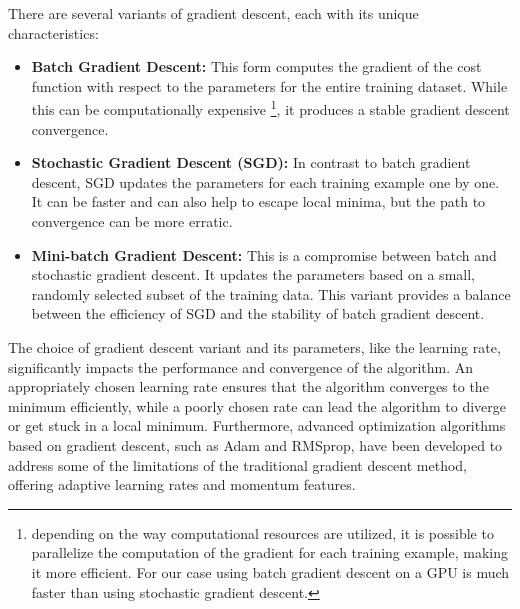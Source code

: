 \documentclass[twoside,11pt]{report}
\begin{document}
    There are several variants of gradient descent, each with its unique characteristics:

    \begin{itemize}
        \item \textbf{Batch Gradient Descent:} This form computes the gradient of the cost function with respect 
            to the parameters for the entire training dataset. While this can be computationally expensive
            \footnote{
                depending on the way computational resources are utilized, it is possible to parallelize the
                computation of the gradient for each training example, making it more efficient.
                For our case using batch gradient descent on a GPU is much faster than using stochastic gradient descent.
            }\label{foot:gpu},
            it produces a stable gradient descent convergence.
        
        \item \textbf{Stochastic Gradient Descent (SGD):} In contrast to batch gradient descent, SGD updates the 
            parameters for each training example one by one. It can be faster 
            and can also help to escape local 
            minima, but the path to convergence can be more erratic.
            
        
        \item \textbf{Mini-batch Gradient Descent:} This is a compromise between batch and stochastic gradient descent. 
            It updates the parameters based on a small, randomly selected subset of the training data. 
            This variant provides a balance between the efficiency of SGD and the stability of batch gradient descent.
    \end{itemize}

    \noindent
    The choice of gradient descent variant and its parameters, like the learning rate, significantly impacts 
    the performance and convergence of the algorithm. An appropriately chosen learning rate ensures that the 
    algorithm converges to the minimum efficiently, while a poorly chosen rate can lead the algorithm to 
    diverge or get stuck in a local minimum.
    Furthermore, advanced optimization algorithms based on gradient descent, such as Adam and RMSprop, 
    have been developed to address some of the limitations of the traditional gradient descent method, 
    offering adaptive learning rates and momentum features.
\end{document}
